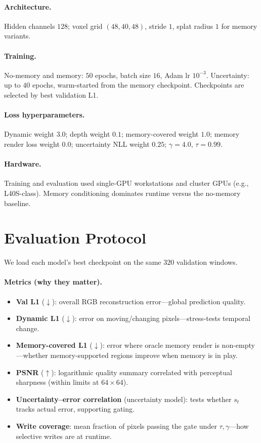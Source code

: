 \documentclass[11pt]{article}
\begin{document}
\paragraph{Architecture.}
Hidden channels $128$; voxel grid $(48,40,48)$, stride $1$, splat radius $1$ for memory variants.

\paragraph{Training.}
No-memory and memory: $50$ epochs, batch size $16$, Adam lr $10^{-3}$. Uncertainty: up to $40$ epochs,
warm-started from the memory checkpoint. Checkpoints are selected by best validation L1.

\paragraph{Loss hyperparameters.}
Dynamic weight $3.0$; depth weight $0.1$; memory-covered weight $1.0$; memory render loss weight $0.0$;
uncertainty NLL weight $0.25$; $\gamma=4.0$, $\tau=0.99$.

\paragraph{Hardware.}
Training and evaluation used single-GPU workstations and cluster GPUs (e.g., L40S-class). Memory
conditioning dominates runtime versus the no-memory baseline.

\section{Evaluation Protocol}
\label{sec:eval}

We load each model's best checkpoint on the same $320$ validation windows.

\paragraph{Metrics (why they matter).}
\begin{itemize}[leftmargin=1.3em,itemsep=2pt]
  \item \textbf{Val L1} ($\downarrow$): overall RGB reconstruction error---global prediction quality.
  \item \textbf{Dynamic L1} ($\downarrow$): error on moving/changing pixels---stress-tests temporal change.
  \item \textbf{Memory-covered L1} ($\downarrow$): error where oracle memory render is non-empty---whether
        memory-supported regions improve when memory is in play.
  \item \textbf{PSNR} ($\uparrow$): logarithmic quality summary correlated with perceptual sharpness (within
        limits at $64\times64$).
  \item \textbf{Uncertainty--error correlation} (uncertainty model): tests whether $s_t$ tracks actual error,
        supporting gating.
  \item \textbf{Write coverage}: mean fraction of pixels passing the gate under $\tau,\gamma$---how
        selective writes are at runtime.
\end{itemize}
\end{document}
